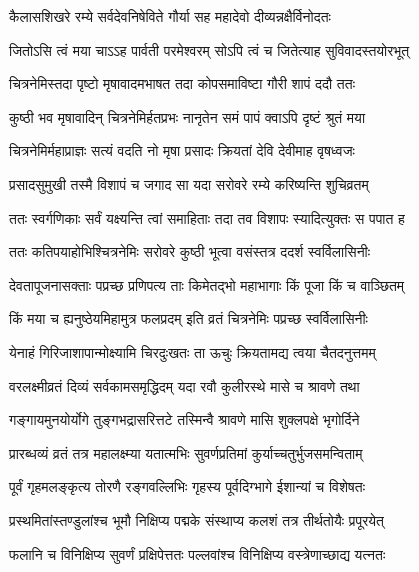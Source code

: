
\begin{center}


\twolineshloka
{कैलासशिखरे रम्ये सर्वदेवनिषेविते}
{गौर्या सह महादेवो दीव्यन्नक्षैर्विनोदतः}%


\twolineshloka
{जितोऽसि त्वं मया चाऽऽह पार्वती परमेश्वरम्}
{सोऽपि त्वं च जितेत्याह सुविवादस्तयोरभूत्}%


\twolineshloka
{चित्रनेमिस्तदा पृष्टो मृषावादमभाषत}
{तदा कोपसमाविष्टा गौरी शापं ददौ ततः}%


\twolineshloka
{कुष्ठी भव मृषावादिन् चित्रनेमिर्हतप्रभः}
{नानृतेन समं पापं क्वाऽपि दृष्टं श्रुतं मया}%


\twolineshloka
{चित्रनेमिर्महाप्राज्ञः सत्यं वदति नो मृषा}
{प्रसादः क्रियतां देवि देवीमाह वृषध्वजः}%


\twolineshloka
{प्रसादसुमुखी तस्मै विशापं च जगाद सा}
{यदा सरोवरे रम्ये करिष्यन्ति शुचिव्रतम्}%


\twolineshloka
{ततः स्वर्गणिकाः सर्वं यक्ष्यन्ति त्वां समाहिताः}
{तदा तव विशापः स्यादित्युक्तः स पपात ह}%


\twolineshloka
{ततः कतिपयाहोभिश्चित्रनेमिः सरोवरे}
{कुष्ठी भूत्वा वसंस्तत्र ददर्श स्वर्विलासिनीः}%


\twolineshloka
{देवतापूजनासक्ताः पप्रच्छ प्रणिपत्य ताः}
{किमेतद्भो महाभागाः किं पूजा किं च वाञ्छितम्}%


\twolineshloka
{किं मया च ह्यनुष्ठेयमिहामुत्र फलप्रदम्}
{इति व्रतं चित्रनेमिः पप्रच्छ स्वर्विलासिनीः}%


\twolineshloka
{येनाहं गिरिजाशापान्मोक्ष्यामि चिरदुःखतः}
{ता ऊचुः क्रियतामद्य त्वया चैतदनुत्तमम्}%


\twolineshloka
{वरलक्ष्मीव्रतं दिव्यं सर्वकामसमृद्धिदम्}
{यदा रवौ कुलीरस्थे मासे च श्रावणे तथा}%


\twolineshloka
{गङ्गायमुनयोर्योगे तुङ्गभद्रासरित्तटे}
{तस्मिन्वै श्रावणे मासि शुक्लपक्षे भृगोर्दिने}%


\twolineshloka
{प्रारब्धव्यं व्रतं तत्र महालक्ष्म्या यतात्मभिः}
{सुवर्णप्रतिमां कुर्याच्चतुर्भुजसमन्विताम्}%


\twolineshloka
{पूर्वं गृहमलङ्कृत्य तोरणै रङ्गवल्लिभिः}
{गृहस्य पूर्वदिग्भागे ईशान्यां च विशेषतः}%


\twolineshloka
{प्रस्थमितांस्तण्डुलांश्च भूमौ निक्षिप्य पद्मके}
{संस्थाप्य कलशं तत्र तीर्थतोयैः प्रपूरयेत्}%


\twolineshloka
{फलानि च विनिक्षिप्य सुवर्णं प्रक्षिपेत्ततः}
{पल्लवांश्च विनिक्षिप्य वस्त्रेणाच्छाद्य यत्नतः}%



\end{center}
